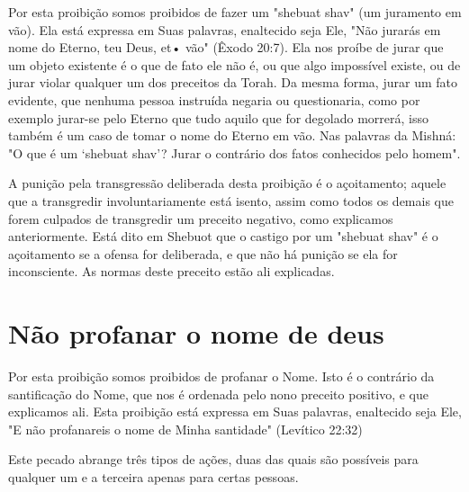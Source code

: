 \begin{itemize}
\begin{enumrate}
\begin{itemize}
\begin{itemize}
\begin{itemize}
Por esta proibição somos proibidos de fazer um "shebuat shav" (um
juramento em vão). Ela está expressa em Suas palavras, enaltecido seja
Ele, "Não jurarás em nome do Eterno, teu Deus, et• vão" (Êxodo 20:7).
Ela nos proíbe de jurar que um objeto existente é o que de fato ele não
é, ou que algo impossí­vel existe, ou de jurar violar qualquer um dos
preceitos da Torah. Da mesma forma, jurar um fato evidente, que nenhuma
pessoa instruída negaria ou ques­tionaria, como por exemplo jurar-se
pelo Eterno que tudo aquilo que for dego­lado morrerá, isso também é um
caso de tomar o nome do Eterno em vão. Nas palavras da Mishná: "O que é
um `shebuat shav'? Jurar o contrário dos fatos conhecidos pelo homem".

A punição pela transgressão deliberada desta proibição é o açoita­mento;
aquele que a transgredir involuntariamente está isento, assim como
to­dos os demais que forem culpados de transgredir um preceito negativo,
como explicamos anteriormente. Está dito em Shebuot que o castigo por um
"she­buat shav" é o açoitamento se a ofensa for deliberada, e que não há
punição se ela for inconsciente. As normas deste preceito estão ali
explicadas.

\section{Não profanar o nome de deus}

Por esta proibição somos proibidos de profanar o Nome. Isto é o
contrário da santificação do Nome, que nos é ordenada pelo nono preceito
po­sitivo, e que explicamos ali. Esta proibição está expressa em Suas
palavras, enal­tecido seja Ele, "E não profanareis o nome de Minha
santidade" (Levítico 22:32)

Este pecado abrange três tipos de ações, duas das quais são possí­veis
para qualquer um e a terceira apenas para certas pessoas.


\end{itemize}
\end{itemize}
\end{itemize}
\end{enumrate}
\end{itemize}
